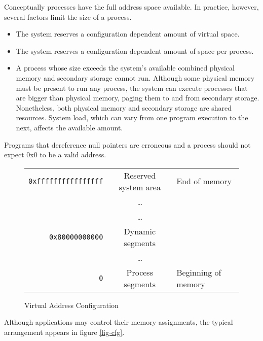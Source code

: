 Conceptually processes have the full address space available.
In practice, however, several factors limit the size of a process.
\begin{itemize}
  \item The system reserves a configuration dependent amount of virtual space.
  \item The system reserves a configuration dependent amount of space per
    process.
  \item
    A process whose size exceeds the system's available combined physical
    memory and secondary storage cannot run. Although some physical memory
    must be present to run any process, the system can execute processes that
    are bigger than physical memory, paging them to and from secondary storage.
    Nonetheless, both physical memory and secondary storage are
    shared resources. System load, which can vary from one program execution
    to the next, affects the available amount.
\end{itemize}

Programs that dereference null pointers are erroneous and a process
should not expect 0x0 to be a valid address.

\begin{figure}[H]
\Hrule
  \caption{Virtual Address Configuration}
  \label{fig-address}
  \begin{center}
    \begin{tabular}{r|c|l}
      \noalign{\smallskip}  \cline{2-2}
      \verb|0xffffffffffffffff| & Reserved system area & End of memory\\
      & \dots & \\ \cline{2-2}
      & \dots & \\
      \verb|0x80000000000| & Dynamic segments & \\ \cline{2-2}
      & \dots & \\
      \verb|0| & Process segments & Beginning of memory\\ \cline{2-2}
    \end{tabular}
  \end{center}
\Hrule
\end{figure}

Although applications may control their memory assignments, the typical
arrangement appears in figure \ref{fig-cfg}.

